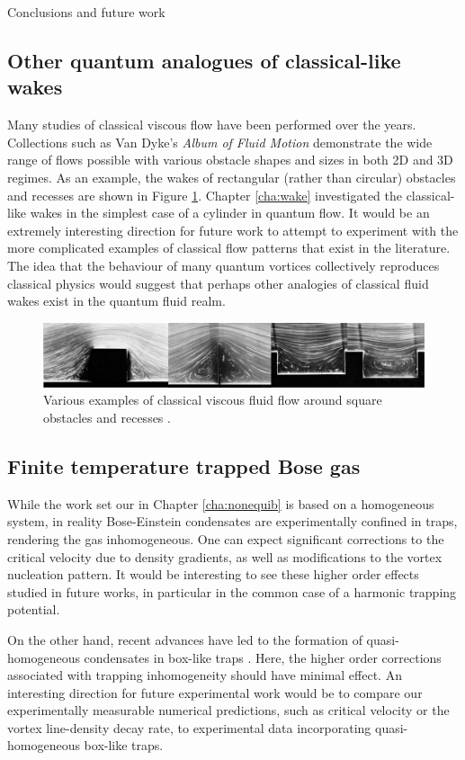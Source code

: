 \begin{chapter}{\label{cha:conc}Conclusions and future work}
\subsection{Other quantum analogues of classical-like wakes}
Many studies of classical viscous flow have been performed over the years. Collections such as Van Dyke's {\it Album of Fluid Motion} \cite{nagib} demonstrate the wide range of flows possible with various obstacle shapes and sizes in both 2D and 3D regimes. As an example, the wakes of rectangular (rather than circular) obstacles and recesses are shown in Figure \ref{fig:dyke-imgs}. Chapter \ref{cha:wake} investigated the classical-like wakes in the simplest case of a cylinder in quantum flow. It would be an extremely interesting direction for future work to attempt to experiment with the more complicated examples of classical flow patterns that exist in the literature. The idea that the behaviour of many quantum vortices collectively reproduces classical physics would suggest that perhaps other analogies of classical fluid wakes exist in the quantum fluid realm. 
\begin{figure}
\centering
    \includegraphics[width=\linewidth]{wake/square.png}
  \caption{Various examples of classical viscous fluid flow around square obstacles and recesses \cite{nagib}.} 
  \label{fig:dyke-imgs}
\end{figure}

\subsection{Finite temperature trapped Bose gas}
While the work set our in Chapter \ref{cha:nonequib} is based on a homogeneous system, in reality Bose-Einstein condensates are experimentally confined in traps, rendering the gas inhomogeneous. One can expect significant corrections to the critical velocity due to density gradients, as well as modifications to the vortex nucleation pattern. It would be interesting to see these higher order effects studied in future works, in particular in the common case of a harmonic trapping potential.

On the other hand, recent advances have led to the formation of quasi-homogeneous condensates in box-like traps \cite{gaunt_2013,chomaz_2015}. Here, the higher order corrections associated with trapping inhomogeneity should have minimal effect. An interesting direction for future experimental work would be to compare our experimentally measurable numerical predictions, such as critical velocity or the vortex line-density decay rate, to experimental data incorporating quasi-homogeneous box-like traps.


\end{chapter}
